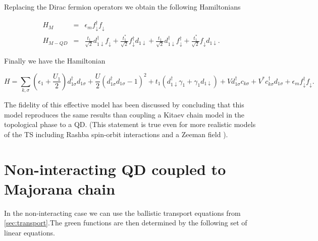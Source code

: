 
Replacing the Dirac fermion operators we obtain the following Hamiltonians 

\begin{eqnarray*}
H_{M} & = & \epsilon_{m}f_{\downarrow}^{\dagger}f_{\downarrow}\\
H_{M-QD}&=&\frac{t_1}{\sqrt{2}}d_{1\downarrow}^{\dagger}f_{\downarrow}+\frac{t_1^{*}}{\sqrt{2}}f_{\downarrow}^{\dagger}d_{1\downarrow}+\frac{t_1}{\sqrt{2}}d_{1\downarrow}^{\dagger}f_{\downarrow}^{\dagger}+\frac{t_1^{*}}{\sqrt{2}}f_{\downarrow}d_{1\downarrow}.
\end{eqnarray*}

\noindent Finally we have the Hamiltonian

\begin{equation}
H =\sum_{k,\sigma}\left(\epsilon_1+\frac{U_1}{2}\right)d_{1\sigma}^{\dagger}d_{1\sigma}+ \frac{U}{2}(d_{1\sigma}^{\dagger}d_{1\sigma}-1)^{2} + t_1 \left(d_{1\downarrow}^{\dagger}\gamma_{1}+\gamma_{1}d_{1\downarrow}\right) + Vd^\dagger_{1\sigma}c_{k\sigma}+V^* c^\dagger_{k\sigma}d_{1\sigma}+ \epsilon_{m}f_{\downarrow}^{\dagger}f_{\downarrow}.
\label{eq:QD-Mham}
\end{equation}


\noindent The fidelity of this effective model has been discussed by \citet{ruiz-tijerina_interaction_2015}
concluding that this model reproduces the
same results than coupling a  Kitaev chain model in the topological phase to a QD.
(This statement is true even for more realistic models of the TS including Rashba spin-orbit interactions and a Zeeman field \citep{ruiz-tijerina_interaction_2015}
).\\


\section{Non-interacting QD coupled to  Majorana chain \label{sec:GreenMaj-DQD}}

In the non-interacting case we can use the ballistic transport equations from \ref{sec:transport}.The green functions are then determined by the following set of linear equations. 




